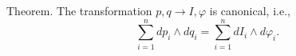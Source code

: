 Theorem. The transformation $p, q \to I, \varphi$ is canonical, i.e.,
$$\sum_{i=1}^{n} dp_i \wedge dq_i = \sum_{i=1}^{n} dI_i \wedge d\varphi_i.$$
